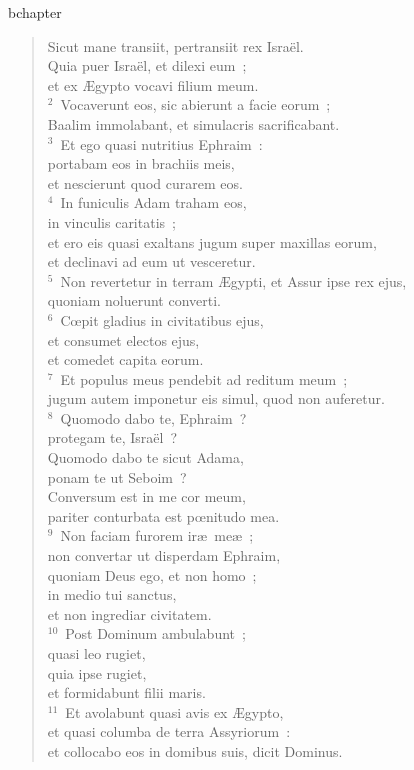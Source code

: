 bchapter\begin{flushleft}\begin{verse}\vspace{-19pt}\hspace{6pt}Sicut mane transiit, pertransiit rex Isra\"el.\\\hspace{6pt} Quia puer Isra\"el, et dilexi eum~;\\ et ex \AE gypto vocavi filium meum.\\
${}^{2}$~Vocaverunt eos, sic abierunt a facie eorum~;\\ Baalim immolabant, et simulacris sacrificabant.\\
${}^{3}$~Et ego quasi nutritius Ephraim~:\\ portabam eos in brachiis meis,\\ et nescierunt quod curarem eos.\\
${}^{4}$~In funiculis Adam traham eos,\\ in vinculis caritatis~;\\ et ero eis quasi exaltans jugum super maxillas eorum,\\ et declinavi ad eum ut vesceretur.\\
${}^{5}$~Non revertetur in terram \AE gypti, et Assur ipse rex ejus,\\ quoniam noluerunt converti.\\
${}^{6}$~Cœpit gladius in civitatibus ejus,\\ et consumet electos ejus,\\ et comedet capita eorum.\\
${}^{7}$~Et populus meus pendebit ad reditum meum~;\\ jugum autem imponetur eis simul, quod non auferetur.\\
${}^{8}$~Quomodo dabo te, Ephraim~?\\ protegam te, Isra\"el~?\\ Quomodo dabo te sicut Adama,\\ ponam te ut Seboim~?\\ Conversum est in me cor meum,\\ pariter conturbata est pœnitudo mea.\\
${}^{9}$~Non faciam furorem ir\ae\ me\ae~;\\ non convertar ut disperdam Ephraim,\\ quoniam Deus ego, et non homo~;\\ in medio tui sanctus,\\ et non ingrediar civitatem.\\
${}^{10}$~Post Dominum ambulabunt~;\\ quasi leo rugiet,\\ quia ipse rugiet,\\ et formidabunt filii maris.\\
${}^{11}$~Et avolabunt quasi avis ex \AE gypto,\\ et quasi columba de terra Assyriorum~:\\ et collocabo eos in domibus suis, dicit Dominus.\end{verse}\end{flushleft}



